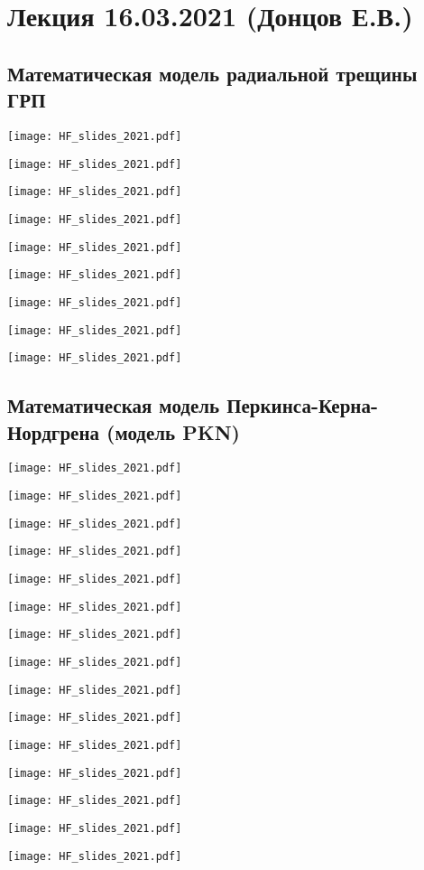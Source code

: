 \documentclass[main.tex]{subfiles}
\begin{document}

\section{Лекция 16.03.2021 (Донцов Е.В.)}

\subsection{Математическая модель радиальной трещины ГРП}

\texttt{[image: HF\_slides\_2021.pdf]}

\texttt{[image: HF\_slides\_2021.pdf]}

\texttt{[image: HF\_slides\_2021.pdf]}

\texttt{[image: HF\_slides\_2021.pdf]}

\texttt{[image: HF\_slides\_2021.pdf]}

\texttt{[image: HF\_slides\_2021.pdf]}

\texttt{[image: HF\_slides\_2021.pdf]}

\texttt{[image: HF\_slides\_2021.pdf]}

\texttt{[image: HF\_slides\_2021.pdf]}

\subsection{Математическая модель Перкинса-Керна-Нордгрена (модель PKN)}

\texttt{[image: HF\_slides\_2021.pdf]}

\texttt{[image: HF\_slides\_2021.pdf]}

\texttt{[image: HF\_slides\_2021.pdf]}

\texttt{[image: HF\_slides\_2021.pdf]}

\texttt{[image: HF\_slides\_2021.pdf]}

\texttt{[image: HF\_slides\_2021.pdf]}

\texttt{[image: HF\_slides\_2021.pdf]}

\texttt{[image: HF\_slides\_2021.pdf]}

\texttt{[image: HF\_slides\_2021.pdf]}

\texttt{[image: HF\_slides\_2021.pdf]}

\texttt{[image: HF\_slides\_2021.pdf]}

\texttt{[image: HF\_slides\_2021.pdf]}

\texttt{[image: HF\_slides\_2021.pdf]}

\texttt{[image: HF\_slides\_2021.pdf]}

\texttt{[image: HF\_slides\_2021.pdf]}
\end{document}
